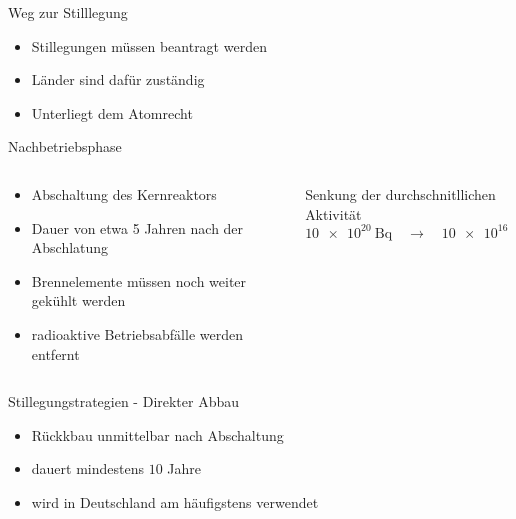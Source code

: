 \begin{frame}{ Weg zur Stilllegung }
  \begin{itemize}
    \setlength\itemsep{1.2em}
      \item{ Stillegungen müssen beantragt werden}
      \item{ Länder sind dafür zuständig}
      \item{ Unterliegt dem Atomrecht}
  \end{itemize}
\end{frame}



\begin{frame}{ Nachbetriebsphase }
  \begin{columns}

    \begin{column}{0.48\textwidth}

        \begin{itemize}
          \setlength\itemsep{1.2em}
          \item{ Abschaltung des Kernreaktors }
          \item{ Dauer von etwa 5 Jahren nach der Abschlatung}
          \item{ Brennelemente müssen noch weiter gekühlt werden }
          \item{ radioaktive Betriebsabfälle werden entfernt }
        \end{itemize}

    \end{column}

    \begin{column}{0.48\textwidth}
      Senkung der durchschnitllichen Aktivität
      \begin{equation*}
        \SI{10e20}{\becquerel} \quad \rightarrow  \quad \SI{10e16}{\becquerel}
      \end{equation*}
    \end{column}

  \end{columns}
\end{frame}



\begin{frame}{Stillegungstrategien - Direkter Abbau}
  \begin{itemize}
    \setlength\itemsep{1.2em}
      \item{ Rückkbau unmittelbar nach Abschaltung }
      \item{ dauert mindestens $10$ Jahre }
      \item{ wird in Deutschland am häufigstens verwendet}
  \end{itemize}
\end{frame}



